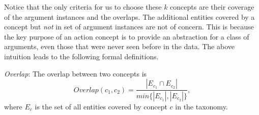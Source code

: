 Notice that the only criteria for us to choose these $k$ concepts are their
coverage of the argument instances and the overlaps. The additional entities
covered by a concept but {\em not} in set of argument instances
are not of concern.
This is because the key purpose of an action concept is to provide an
abstraction for a class of arguments, even those that were never seen before
in the data.
%
%
The above intuition leads to the following formal definitions.
\begin{definition}
\emph{Overlap}:
The overlap between two concepts is
\begin{equation}
\label{eq:overlap}
Overlap(c_1,c_2)=\frac{|E_{c_1}\cap E_{c_2}|}{min\{ |E_{c_1}|,|E_{c_2}| \}},
\end{equation}
where $E_c$ is the set of all entities covered by concept $c$ in the
taxonomy.
\end{definition}
